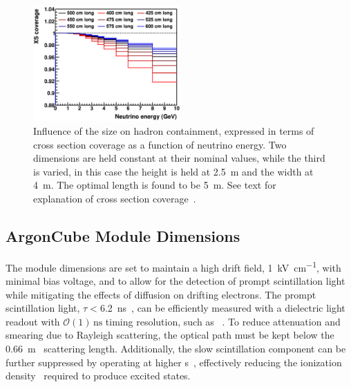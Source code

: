 \begin{figure}[tbp]
	\centering
	\includegraphics[width=0.5\textwidth]{graphics/length.png}
	\caption{Influence of the  size on hadron containment, expressed in terms of cross section coverage as a function of neutrino energy.
		Two dimensions are held constant at their nominal values, while the third is varied, in this case the height is held at \SI{2.5}{\metre} and the width at \SI{4}{\metre}.
		The optimal length is found to be \SI{5}{\metre}.
		See text for explanation of cross section coverage~\cite{lartpcSizeChris}.}
	\label{fig:dune-nd_lartpc-size}
\end{figure}


\subsection{ArgonCube Module Dimensions}

The     module dimensions are set to maintain a high drift field, \SI{1}{\kilo\volt\per\centi\metre}, with minimal bias voltage, and to allow for the detection of prompt scintillation light while mitigating the effects of diffusion on drifting electrons.
The prompt scintillation light, $\tau<$\SI{6.2}{\nano\second}~\cite{Heindl:2015yaa}, can be efficiently measured with a dielectric light readout with $\mathcal{O}\left(1\right)\,\mathrm{ns}$ timing resolution, such as ~\cite{Auger:2017flc}.
To reduce attenuation and smearing due to Rayleigh scattering, the optical path must be kept below the \SI{0.66}{\metre}~\cite{Grace:2015yta} scattering length.   Additionally, the slow scintillation component can be further suppressed by operating at higher \efield{}s~\cite{PhysRevB.20.3486}, effectively reducing the ionization density~\cite{PhysRevB.27.5279} required to produce excited states. 

